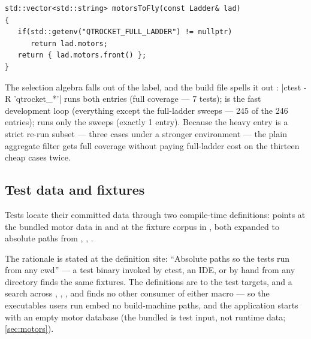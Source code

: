 \begin{listing}[htbp]
\begin{verbatim}
std::vector<std::string> motorsToFly(const Ladder& lad)
{
   if(std::getenv("QTROCKET_FULL_LADDER") != nullptr)
      return lad.motors;
   return { lad.motors.front() };
}
\end{verbatim}
\caption{The entire light/heavy switch . The
build's heavy ctest entry sets the environment variable; the code reads only its
presence.}\label{lst:testing-ladder}
\end{listing}

The selection algebra falls out of the label, and the build file spells it out
: \cppinline|ctest -R 'qtrocket_*'| runs both entries
(full coverage --- 7 tests);  is the fast development loop
(everything except the full-ladder sweeps --- 245 of the 246 entries);  runs only the sweeps (exactly 1 entry). Because the heavy entry is a strict
re-run subset --- three cases under a stronger environment --- the plain aggregate
filter gets full coverage without paying full-ladder cost on the thirteen cheap cases
twice.

\subsection{Test data and fixtures}\label{sec:testing-data}

Tests locate their committed data through two compile-time definitions:
 points at the bundled motor data in  and
 at the fixture corpus in , both
expanded to absolute paths from 
, ,
.

\begin{designrule}
The rationale is stated at the definition site: ``Absolute paths so the tests run from
any cwd''  --- a test binary invoked by ctest, an IDE, or
by hand from any directory finds the same fixtures. The definitions are 
to the test targets, and a search across , , , and
 finds no other consumer of either macro --- so the executables users run
embed no build-machine paths, and the application starts with an empty motor database
(the bundled  is test input, not runtime data;
\cref{sec:motors}).
\end{designrule}

